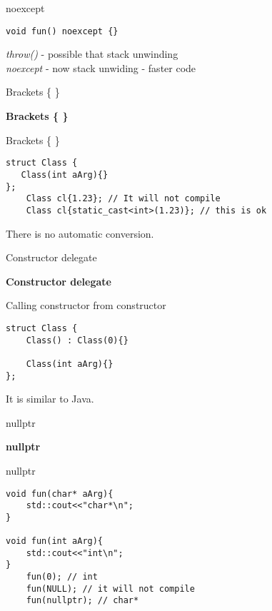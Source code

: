 \documentclass{beamer}
\begin{document}
\begin{frame}[fragile]{noexcept}
\begin{lstlisting}[style=customcpp]
void fun() noexcept {}
\end{lstlisting}
\textit{throw()} - possible that stack unwinding \\
\textit{noexcept} - now stack unwiding - faster code \\
\end{frame}

\begin{frame}[fragile]{Brackets \{ \}}
\begin{center}
{\Huge \textbf{Brackets \{ \}}}
\end{center}
\end{frame}

\begin{frame}[fragile]{Brackets \{ \}}
\begin{lstlisting}[style=customcpp]
struct Class {
   Class(int aArg){}
};
	Class cl{1.23}; // It will not compile
	Class cl{static_cast<int>(1.23)}; // this is ok
\end{lstlisting}
There is no automatic conversion.
\end{frame}

\begin{frame}[fragile]{Constructor delegate}
\begin{center}
{\Huge \textbf{Constructor delegate}}
\end{center}
\end{frame}

\begin{frame}[fragile]{Calling constructor from constructor}
\begin{lstlisting}[style=customcpp]
struct Class {
	Class() : Class(0){}

	Class(int aArg){}
};
\end{lstlisting}
It is similar to Java.
\end{frame}

\begin{frame}[fragile]{nullptr}
\begin{center}
{\Huge \textbf{nullptr}}
\end{center}
\end{frame}

\begin{frame}[fragile]{nullptr}
\begin{lstlisting}[style=customcpp]
void fun(char* aArg){
	std::cout<<"char*\n";
}

void fun(int aArg){
	std::cout<<"int\n";
}
	fun(0); // int
	fun(NULL); // it will not compile
	fun(nullptr); // char*
\end{lstlisting}
\end{frame}
\end{document}
